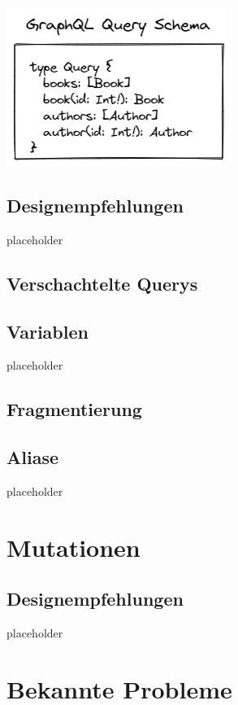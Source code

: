 \includegraphics{pics/GraphQL_Query_Schema.png}

\subsection{Designempfehlungen}

placeholder
\pagebreak

\subsection{Verschachtelte Querys}

\subsection{Variablen}

placeholder
\pagebreak

\subsection{Fragmentierung}

\subsection{Aliase}

placeholder
\pagebreak

\section{Mutationen}

\subsection{Designempfehlungen}

placeholder
\pagebreak

\section{Bekannte Probleme}

